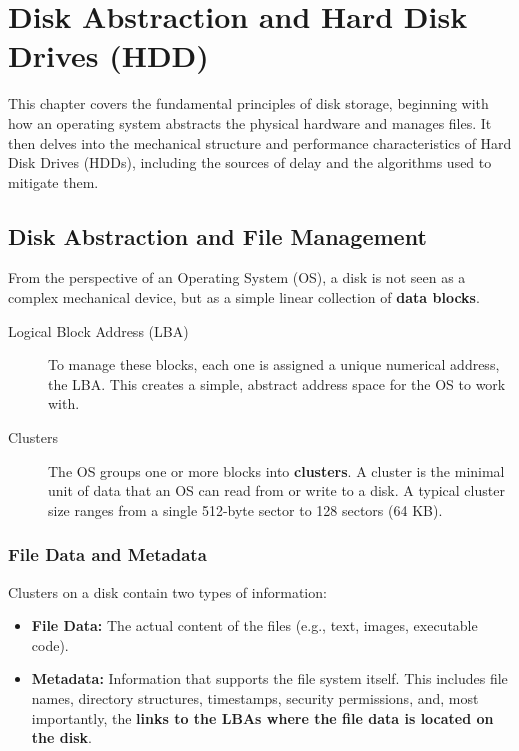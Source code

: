\chapter{Disk Abstraction and Hard Disk Drives (HDD)}

This chapter covers the fundamental principles of disk storage, beginning with how an operating system abstracts the physical hardware and manages files. It then delves into the mechanical structure and performance characteristics of Hard Disk Drives (HDDs), including the sources of delay and the algorithms used to mitigate them.

\section{Disk Abstraction and File Management}
From the perspective of an Operating System (OS), a disk is not seen as a complex mechanical device, but as a simple linear collection of \textbf{data blocks}.

\begin{description}
    \item[Logical Block Address (LBA)] To manage these blocks, each one is assigned a unique numerical address, the LBA. This creates a simple, abstract address space for the OS to work with.
    \item[Clusters] The OS groups one or more blocks into \textbf{clusters}. A cluster is the minimal unit of data that an OS can read from or write to a disk. A typical cluster size ranges from a single 512-byte sector to 128 sectors (64 KB).
\end{description}

\subsection{File Data and Metadata}
Clusters on a disk contain two types of information:
\begin{itemize}
    \item \textbf{File Data:} The actual content of the files (e.g., text, images, executable code).
    \item \textbf{Metadata:} Information that supports the file system itself. This includes file names, directory structures, timestamps, security permissions, and, most importantly, the \textbf{links to the LBAs where the file data is located on the disk}.
\end{itemize}

